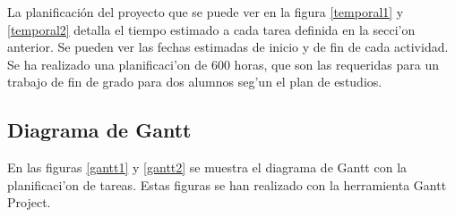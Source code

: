 La planificación del proyecto que se puede ver en la figura \ref{temporal1} y \ref{temporal2} detalla el tiempo estimado a cada tarea definida en la secci'on anterior.
Se pueden ver las fechas estimadas de inicio y de fin de cada actividad.
Se ha realizado una planificaci'on de 600 horas, que son las requeridas para un trabajo de fin de grado para dos alumnos seg'un el plan de estudios.

\clearpage

\subsection{Diagrama de Gantt}
En las figuras \ref{gantt1} y \ref{gantt2} se muestra el diagrama de Gantt con la planificaci'on de tareas. Estas figuras se han realizado con la herramienta Gantt Project.
\clearpage